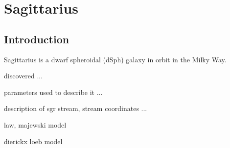 \hypertarget{sagittarius}{%
\chapter{Sagittarius}\label{sagittarius}}

\hypertarget{introductionsgr}{%
\section{Introduction}\label{introductionsgr}}

Sagittarius is a dwarf spheroidal (dSph) galaxy in orbit in the Milky Way.

discovered ... 

parameters used to describe it ... 

description of sgr stream, stream coordinates ... 

law, majewski model 

dierickx loeb model 

